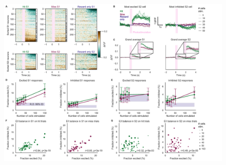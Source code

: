 \begin{figure}[htbp]
\vspace*{-2.5cm}
\hspace*{-0.25in}
\includegraphics[scale=0.45]{figures/basic-analysis.pdf}
\caption[\textbf{Structure of evoked activity in S1 and S2}]{
}
\end{figure}
